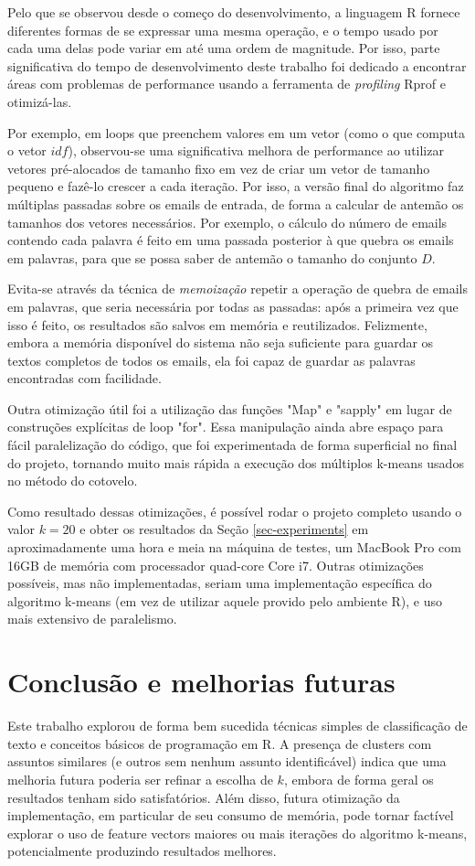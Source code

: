 \documentclass[10pt,twocolumn,letterpaper]{article}
\begin{document}
Pelo que se observou desde o começo do desenvolvimento, a linguagem R fornece diferentes formas de se expressar uma mesma operação, e o tempo usado por cada uma delas pode variar em até uma ordem de magnitude. Por isso, parte significativa do tempo de desenvolvimento deste trabalho foi dedicado a encontrar áreas com problemas de performance usando a ferramenta de \emph{profiling} Rprof e otimizá-las.

Por exemplo, em loops que preenchem valores em um vetor (como o que computa o vetor $idf$), observou-se uma significativa melhora de performance ao utilizar vetores pré-alocados de tamanho fixo em vez de criar um vetor de tamanho pequeno e fazê-lo crescer a cada iteração. Por isso, a versão final do algoritmo faz múltiplas passadas sobre os emails de entrada, de forma a calcular de antemão os tamanhos dos vetores necessários. Por exemplo, o cálculo do número de emails contendo cada palavra é feito em uma passada posterior à que quebra os emails em palavras, para que se possa saber de antemão o tamanho do conjunto $D$.

Evita-se através da técnica de \emph{memoização} repetir a operação de quebra de emails em palavras, que seria necessária por todas as passadas: após a primeira vez que isso é feito, os resultados são salvos em memória e reutilizados. Felizmente, embora a memória disponível do sistema não seja suficiente para guardar os textos completos de todos os emails, ela foi capaz de guardar as palavras encontradas com facilidade.

Outra otimização útil foi a utilização das funções "Map" e "sapply" em lugar de construções explícitas de loop "for". Essa manipulação ainda abre espaço para fácil paralelização do código, que foi experimentada de forma superficial no final do projeto, tornando muito mais rápida a execução dos múltiplos k-means usados no método do cotovelo.

Como resultado dessas otimizações, é possível rodar o projeto completo usando o valor $k = 20$ e obter os resultados da Seção \ref{sec-experiments} em aproximadamente uma hora e meia na máquina de testes, um MacBook Pro com 16GB de memória com processador quad-core Core i7. Outras otimizações possíveis, mas não implementadas, seriam uma implementação específica do algoritmo k-means (em vez de utilizar aquele provido pelo ambiente R), e uso mais extensivo de paralelismo.

\section{Conclusão e melhorias futuras}
Este trabalho explorou de forma bem sucedida técnicas simples de classificação de texto e conceitos básicos de programação em R. A presença de clusters com assuntos similares (e outros sem nenhum assunto identificável) indica que uma melhoria futura poderia ser refinar a escolha de $k$, embora de forma geral os resultados tenham sido satisfatórios. Além disso, futura otimização da implementação, em particular de seu consumo de memória, pode tornar factível explorar o uso de feature vectors maiores ou mais iterações do algoritmo k-means, potencialmente produzindo resultados melhores.

{\small


}
\end{document}
